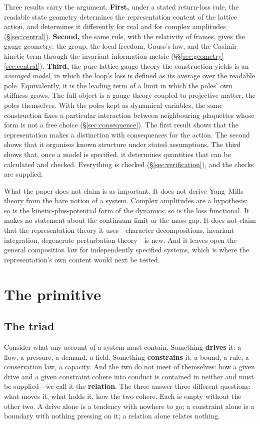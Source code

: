 \documentclass[11pt,a4paper]{article}
\theoremstyle{plain}
\theoremstyle{definition}
\theoremstyle{remark}
\begin{document}
Three results carry the argument. \textbf{First,} under a stated return-loss rule, the readable state geometry determines the representation content of the lattice action, and determines it differently for real and for complex amplitudes (\S\ref{sec:central}). \textbf{Second,} the same rule, with the relativity of frames, gives the gauge geometry: the group, the local freedom, Gauss's law, and the Casimir kinetic term through the invariant information metric (\S\S\ref{sec:geometry}--\ref{sec:central}). \textbf{Third,} the pure lattice gauge theory the construction yields is an \emph{averaged model}, in which the loop's loss is defined as its average over the readable pole. Equivalently, it is the leading term of a limit in which the poles' own stiffness grows. The full object is a gauge theory coupled to projective matter, the poles themselves. With the poles kept as dynamical variables, the same construction fixes a particular interaction between neighbouring plaquettes whose form is not a free choice (\S\ref{sec:consequence}). The first result shows that the representation makes a distinction with consequences for the action. The second shows that it organises known structure under stated assumptions. The third shows that, once a model is specified, it determines quantities that can be calculated and checked. Everything is checked (\S\ref{sec:verification}), and the checks are supplied.

What the paper does not claim is as important. It does not derive Yang--Mills theory from the bare notion of a system. Complex amplitudes are a hypothesis; so is the kinetic-plus-potential form of the dynamics; so is the loss functional. It makes no statement about the continuum limit or the mass gap. It does not claim that the representation theory it uses---character decompositions, invariant integration, degenerate perturbation theory---is new. And it leaves open the general composition law for independently specified systems, which is where the representation's own content would next be tested.

\section{The primitive}

\subsection{The triad}

Consider what any account of a system must contain. Something \textbf{drives} it: a flow, a pressure, a demand, a field. Something \textbf{constrains} it: a bound, a rule, a conservation law, a capacity. And the two do not meet of themselves: how a given drive and a given constraint cohere into conduct is contained in neither and must be supplied---we call it the \textbf{relation}. The three answer three different questions: what moves it, what holds it, how the two cohere. Each is empty without the other two. A drive alone is a tendency with nowhere to go; a constraint alone is a boundary with nothing pressing on it; a relation alone relates nothing.
\end{document}
